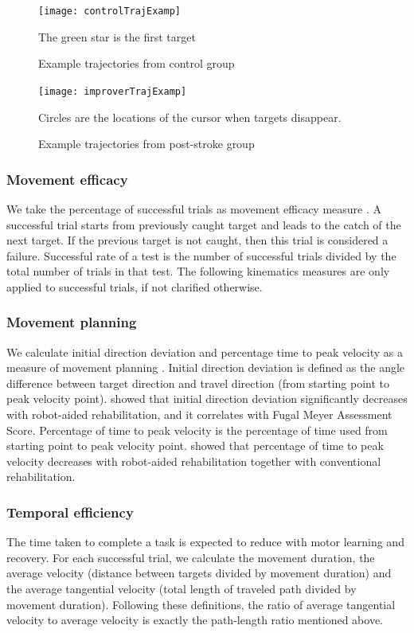 \begin{figure}
	\texttt{[image: controlTrajExamp]}
	\centering
	\caption{Example trajectories from control group}
	\medskip
	\small The green star is the first target
	\label{fig:controlTrajExamp}
\end{figure}

\begin{figure}
	\texttt{[image: improverTrajExamp]}
	\centering
	\caption{Example trajectories from post-stroke group}
	\medskip
	\small Circles are the locations of the cursor when targets disappear.
	\label{fig:improverTrajExamp}
\end{figure}

\subsubsection{Movement efficacy}
We take the percentage of successful trials as movement efficacy measure \cite{Nordin2014}. 
A successful trial starts from previously caught target and leads to the catch of the next target. 
If the previous target is not caught, then this trial is considered a failure.
Successful rate of a test is the number of successful trials divided by the total number of trials in that test.
The following kinematics measures are only applied to successful trials, if not clarified otherwise.

\subsubsection{Movement planning}
We calculate initial direction deviation and percentage time to peak velocity as a measure of movement planning \cite{Nordin2014}. 
Initial direction deviation is defined as the angle difference between target direction and travel direction (from starting point to peak velocity point).
\cite{Zollo2011} showed that initial direction deviation significantly decreases with robot-aided rehabilitation, and it correlates with Fugal Meyer Assessment Score.
Percentage of time to peak velocity is the percentage of time used from starting point to peak velocity point.
\cite{Chang2007} showed that percentage of time to peak velocity decreases with robot-aided rehabilitation together with conventional rehabilitation.

\subsubsection{Temporal efficiency}
The time taken to complete a task is expected to reduce with motor learning and recovery.
For each successful trial, we calculate the movement duration, the average velocity (distance between targets divided by movement duration) and the average tangential velocity (total length of traveled path divided by movement duration).
Following these definitions, the ratio of average tangential velocity to average velocity is exactly the path-length ratio mentioned above.

